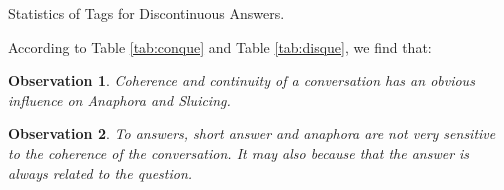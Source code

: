 \documentclass[bsc,frontabs,twoside,singlespacing,parskip,deptreport]{infthesis}     %
\newtheorem{observation}{Observation}[chapter]
\begin{document}
\begin{minipage}{\textwidth}
\begin{minipage}[t]{0.45\textwidth}
        \end{minipage}
        \begin{minipage}[t]{0.45\textwidth}
        \centering
        \makeatletter{}\makeatother
{}
\caption{Statistics of Tags for Discontinuous Answers.}
\label{tab:disans}

        \end{minipage}
    \end{minipage}


According to Table \ref{tab:conque} and Table \ref{tab:disque}, we find that:

\begin{observation}
Coherence and continuity of a conversation has an obvious influence on Anaphora and Sluicing.
\end{observation}

\begin{observation}
To answers, short answer and anaphora are not very sensitive to the coherence of the conversation. It may also because that the answer is always related to the question.
\end{observation}
\end{document}
